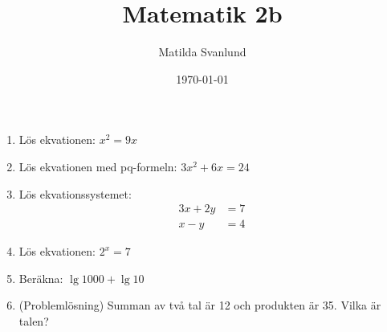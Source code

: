 \documentclass[a4paper,11pt]{article}
\title{Matematik 2b}
\author{Matilda Svanlund}
\date{\today}
\begin{document}
\maketitle

\begin{enumerate}[label=\textbf{\arabic*.}]
    \item Lös ekvationen: $x^2  = 9x$
    
    \item Lös ekvationen med pq-formeln: $3x^2 + 6x  = 24$
    
    \item Lös ekvationssystemet:
    \begin{align*}
    3x + 2y &= 7\\
    x - y &= 4
    \end{align*}
    
    \item Lös ekvationen: $2^x = 7$
    
    \item Beräkna: $\lg 1000 + \lg 10$
    
    \item (Problemlösning) Summan av två tal är 12 och produkten är 35. Vilka är talen?
\end{enumerate}
\end{document}
